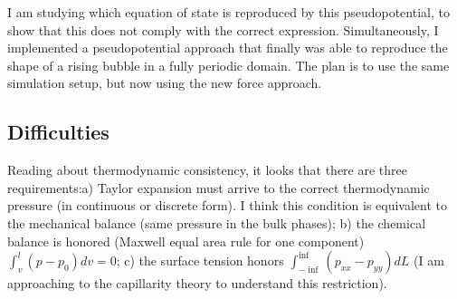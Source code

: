 \documentclass[12pt]{article}
\begin{document}
	I am studying which equation of state is reproduced by this pseudopotential, to show that this does not comply with the correct expression. Simultaneously, I implemented a pseudopotential approach that finally was able to reproduce the shape of a rising bubble in a fully periodic domain. The plan is to use the same simulation setup, but now using the new force approach.

	\subsection*{Difficulties}
	Reading about thermodynamic consistency, it looks that there are three requirements:a) Taylor expansion must arrive to the correct thermodynamic pressure (in continuous or discrete form). I think this condition is equivalent to the mechanical balance (same pressure in the bulk phases); b) the chemical balance is honored (Maxwell equal area rule for one component) $\int_v^l (p - p_0)d v = 0$; c) the surface tension honors $\int^{\inf}_{-\inf} (p_{xx}-p_{yy}) dL$ (I am approaching to the capillarity theory to understand this restriction).
	
	
\end{document}
